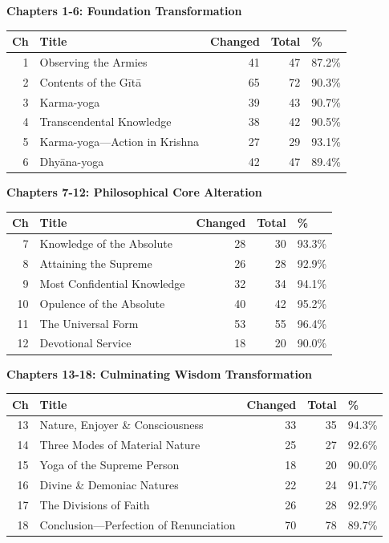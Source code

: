 \documentclass[11pt,twoside]{book}
\begin{document}
\textbf{\textbf{Chapters 1-6: Foundation Transformation}}

\small
\begin{center}
\begin{tabular}{rlrrl}
Ch & Title & Changed & Total & \%\\
\hline
1 & Observing the Armies & 41 & 47 & 87.2\%\\
2 & Contents of the Gītā & 65 & 72 & 90.3\%\\
3 & Karma-yoga & 39 & 43 & 90.7\%\\
4 & Transcendental Knowledge & 38 & 42 & 90.5\%\\
5 & Karma-yoga—Action in Krishna & 27 & 29 & 93.1\%\\
6 & Dhyāna-yoga & 42 & 47 & 89.4\%\\
\end{tabular}
\end{center}

\textbf{\textbf{Chapters 7-12: Philosophical Core Alteration}}

\small
\begin{center}
\begin{tabular}{rlrrl}
Ch & Title & Changed & Total & \%\\
\hline
7 & Knowledge of the Absolute & 28 & 30 & 93.3\%\\
8 & Attaining the Supreme & 26 & 28 & 92.9\%\\
9 & Most Confidential Knowledge & 32 & 34 & 94.1\%\\
10 & Opulence of the Absolute & 40 & 42 & 95.2\%\\
11 & The Universal Form & 53 & 55 & 96.4\%\\
12 & Devotional Service & 18 & 20 & 90.0\%\\
\end{tabular}
\end{center}

\textbf{\textbf{Chapters 13-18: Culminating Wisdom Transformation}}

\small
\begin{center}
\begin{tabular}{rlrrl}
Ch & Title & Changed & Total & \%\\
\hline
13 & Nature, Enjoyer \& Consciousness & 33 & 35 & 94.3\%\\
14 & Three Modes of Material Nature & 25 & 27 & 92.6\%\\
15 & Yoga of the Supreme Person & 18 & 20 & 90.0\%\\
16 & Divine \& Demoniac Natures & 22 & 24 & 91.7\%\\
17 & The Divisions of Faith & 26 & 28 & 92.9\%\\
18 & Conclusion—Perfection of Renunciation & 70 & 78 & 89.7\%\\
\end{tabular}
\end{center}
\end{document}
